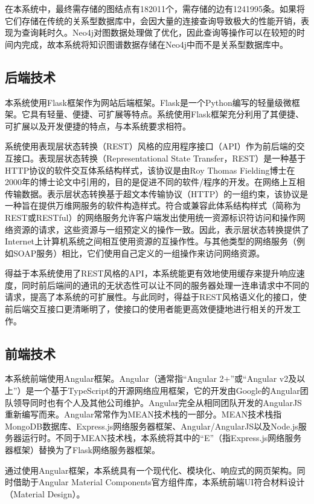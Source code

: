 \documentclass{bjfuthesis}
\begin{document}
在本系统中，最终需存储的图结点有182011个，需存储的边有1241995条。如果将它们存储在传统的关系型数据库中，会因大量的连接查询导致极大的性能开销，表现为查询耗时久。Neo4j对图数据处理做了优化，因此查询等操作可以在较短的时间内完成，故本系统将知识图谱数据存储在Neo4j中而不是关系型数据库中。

\subsection{后端技术}
本系统使用Flask框架作为网站后端框架。Flask是一个Python编写的轻量级微框架。它具有轻量、便捷、可扩展等特点。系统使用Flask框架充分利用了其便捷、可扩展以及开发便捷的特点，与本系统要求相符。

系统使用表现层状态转换（REST）风格的应用程序接口（API）作为前后端的交互接口。表现层状态转换（Representational State Transfer，REST）是一种基于HTTP协议的软件交互体系结构样式，该协议是由Roy Thomas Fielding博士在2000年的博士论文中引用的\cite{fielding2000architectural}，目的是促进不同的软件/程序的开发。在网络上互相传输数据。表示层状态转换基于超文本传输​​协议（HTTP）的一组约束，该协议是一种旨在提供万维网服务的软件构造样式。符合或兼容此体系结构样式（简称为REST或RESTful）的网络服务允许客户端发出使用统一资源标识符访问和操作网络资源的请求，这些资源与一组预定义的操作一致。因此，表示层状态转换提供了Internet上计算机系统之间相互使用资源的互操作性。与其他类型的网络服务（例如SOAP服务）相比，它们使用自己定义的一组操作来访问网络资源。

得益于本系统使用了REST风格的API，本系统能更有效地使用缓存来提升响应速度，同时前后端间的通讯的无状态性可以让不同的服务器处理一连串请求中不同的请求，提高了本系统的可扩展性。与此同时，得益于REST风格语义化的接口，使前后端交互接口更清晰明了，使接口的使用者能更高效便捷地进行相关的开发工作。
\subsection{前端技术}
本系统前端使用Angular框架。Angular（通常指“Angular 2+”或“Angular v2及以上”）是一个基于TypeScript的开源网络应用框架，它的开发由Google的Angular团队领导同时也有个人及其他公司维护。Angular完全从相同团队开发的AngularJS重新编写而来。Angular常常作为MEAN技术栈的一部分。MEAN技术栈指MongoDB数据库、Express.js网络服务器框架、Angular/AngularJS以及Node.js服务器运行时。不同于MEAN技术栈，本系统将其中的“E”（指Express.js网络服务器框架）替换为了Flask网络服务器框架。

通过使用Angular框架，本系统具有一个现代化、模块化、响应式的网页架构。同时借助于Angular Material Components官方组件库，本系统前端UI符合材料设计（Material Design）。
\end{document}

